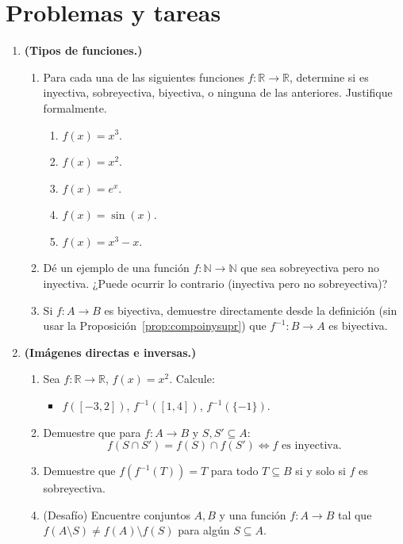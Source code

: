 \section{Problemas y tareas}

\begin{enumerate}[leftmargin=2.5em, label=\textbf{\arabic*.}]

  \item \textbf{(Tipos de funciones.)}
  \begin{enumerate}[label=(\alph*)]
    \item Para cada una de las siguientes funciones $f: \mathbb{R} \to \mathbb{R}$, determine si es inyectiva, sobreyectiva, biyectiva, o ninguna de las anteriores. Justifique formalmente.
    \begin{enumerate}[label=(\roman*)]
      \item $f(x) = x^3$.
      \item $f(x) = x^2$.
      \item $f(x) = e^x$.
      \item $f(x) = \sin(x)$.
      \item $f(x) = x^3 - x$.
    \end{enumerate}
    \item Dé un ejemplo de una función $f: \mathbb{N} \to \mathbb{N}$ que sea sobreyectiva pero no inyectiva. ¿Puede ocurrir lo contrario (inyectiva pero no sobreyectiva)?
    \item Si $f: A \to B$ es biyectiva, demuestre directamente desde la definición (sin usar la Proposición~\ref{prop:compoinysupr}) que $f^{-1}: B \to A$ es biyectiva.
  \end{enumerate}

  \item \textbf{(Imágenes directas e inversas.)}
  \begin{enumerate}[label=(\alph*)]
    \item Sea $f: \mathbb{R} \to \mathbb{R}$, $f(x) = x^2$. Calcule:
    \begin{itemize}
      \item $f([-3, 2])$, $f^{-1}([1, 4])$, $f^{-1}(\{-1\})$.
    \end{itemize}
    \item Demuestre que para $f: A \to B$ y $S, S' \subseteq A$:
    \[
      f(S \cap S') = f(S) \cap f(S') \iff f \text{ es inyectiva}.
    \]
    \item Demuestre que $f(f^{-1}(T)) = T$ para todo $T \subseteq B$ si y solo si $f$ es sobreyectiva.
    \item (Desafío) Encuentre conjuntos $A, B$ y una función $f: A \to B$ tal que $f(A \setminus S) \neq f(A) \setminus f(S)$ para algún $S \subseteq A$.
  \end{enumerate}


\end{enumerate}
